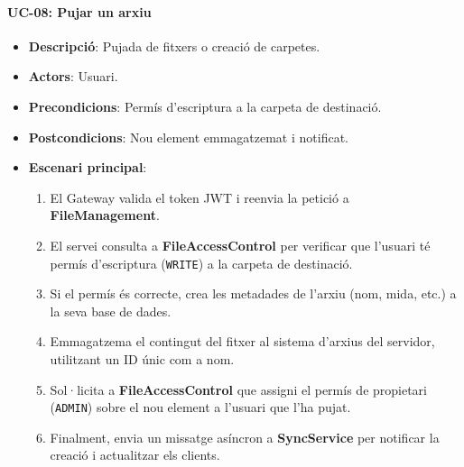 \paragraph{UC-08: Pujar un arxiu}
\begin{itemize}
  \item \textbf{Descripció}: Pujada de fitxers o creació de carpetes.
  \item \textbf{Actors}: Usuari.
  \item \textbf{Precondicions}: Permís d'escriptura a la carpeta de destinació.
  \item \textbf{Postcondicions}: Nou element emmagatzemat i notificat.
  \item \textbf{Escenari principal}:
    \begin{enumerate}
        \item El Gateway valida el token JWT i reenvia la petició a \textbf{FileManagement}.
        \item El servei consulta a \textbf{FileAccessControl} per verificar que l'usuari té permís d'escriptura (\texttt{WRITE}) a la carpeta de destinació.
        \item Si el permís és correcte, crea les metadades de l'arxiu (nom, mida, etc.) a la seva base de dades.
        \item Emmagatzema el contingut del fitxer al sistema d'arxius del servidor, utilitzant un ID únic com a nom.
        \item Sol·licita a \textbf{FileAccessControl} que assigni el permís de propietari (\texttt{ADMIN}) sobre el nou element a l'usuari que l'ha pujat.
        \item Finalment, envia un missatge asíncron a \textbf{SyncService} per notificar la creació i actualitzar els clients.
    \end{enumerate}
\end{itemize}


